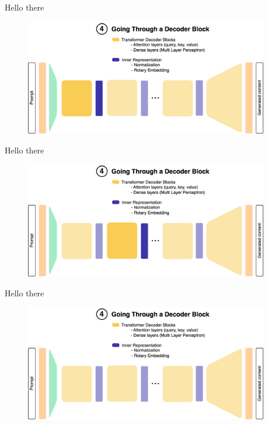 \documentclass[11pt,aspectratio=169]{beamer}
\begin{document}
\begin{frame}{Hello there}
    \begin{figure}
        \centering
        \includegraphics[width=0.95\textwidth]{llm_4.png}
    \end{figure}
\end{frame}

\begin{frame}{Hello there}
    \begin{figure}
        \centering
        \includegraphics[width=0.95\textwidth]{llm_5.png}
    \end{figure}
\end{frame}

\begin{frame}{Hello there}
    \begin{figure}
        \centering
        \includegraphics[width=0.95\textwidth]{llm_6.png}
    \end{figure}
\end{frame}
\end{document}
